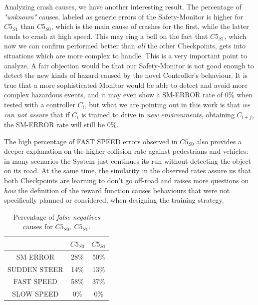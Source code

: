 Analyzing crash causes, we have another interesting result. The percentage of \textsl{"unknown"} causes, labeled as generic errors of the Safety-Monitor is higher for $C5_{S1}$ than $C5_{S0}$, which is the main cause of crashes for the first, while the latter tends to crash at high speed. This may ring a bell on the fact that $C5_{S1}$, which now we can confirm performed better than \textsl{all} the other Checkpoints, gets into situations which are more complex to handle. This is a very important point to analyze. A fair objection would be that our Safety-Monitor is not good enough to detect the new kinds of hazard caused by the novel Controller's behaviour. It is true that a more sophisticated Monitor would be able to detect and avoid more complex hazardous events, and it may even show a SM-ERROR rate of $0\%$ when tested with a controller $C_{i}$, but what we are pointing out in this work is that \textsl{we can not assure} that if $C_{i}$ is trained to drive in \textsl{new environments}, obtaining $C_{i+j}$, the SM-ERROR rate will still be $0\%$.

The high percentage of FAST SPEED errors observed in $C5_{S0}$ also provides a deeper explanation on the higher collision rate against pedestrians and vehicles: in many scenarios the System just continues its run without detecting the object on its road. At the same time, the similarity in the observed rates assure us that both Checkpoints are learning to don't go off-road and raises more questions on \textsl{how} the definition of the reward function causes behaviours that were not specifically planned or considered, when designing the training strategy.

\begin{table}
	\begin{center}
		\begin{tabular}{ |c|c|c| }
			\hline
			& $C5_{S0}$ & $C5_{S1}$ \\
			\hline
			SM ERROR & 28\% & 50\% \\
			\hline
			SUDDEN STEER & 14\% & 13\% \\
			\hline
			FAST SPEED & 58\% & 37\% \\
			\hline
			SLOW SPEED & 0\% & 0\% \\
			\hline
		\end{tabular}
		\caption{Percentage of \textsl{false negatives} causes for $C5_{S0},\: C5_{S1}$.}
	\end{center}
\end{table}
